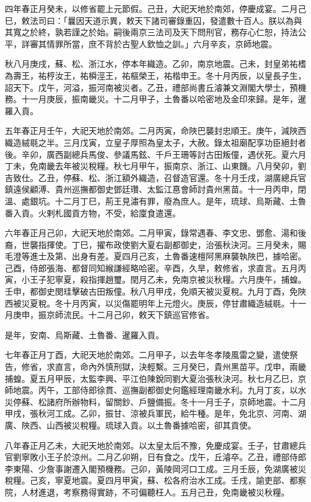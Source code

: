 \begin{pinyinscope}
四年春正月癸未，以修省罷上元節假。己丑，大祀天地於南郊，停慶成宴。二月己巳，敕法司曰：「曩因天道示異，敕天下諸司審錄重囚，發遣數十百人。朕以為與其寬之於終，孰若謹之於始。嗣後兩京三法司及天下問刑官，務存心仁恕，持法公平，詳審其情罪所當，庶不背於古聖人欽恤之訓。」六月辛亥，京師地震。

秋八月庚戌，蘇、松、浙江水，停本年織造。乙卯，南京地震。己未，封皇弟祐榰為壽王，祐梈汝王，祐橓涇王，祐樞榮王，祐楷申王。冬十月丙辰，以皇長子生，詔天下。戊午，河溢，振河南被災者。乙丑，禮部尚書丘濬兼文淵閣大學士，預機務。十一月庚辰，振南畿災。十二月甲子，土魯番以哈密地及金印來歸。是年，暹羅入貢。

五年春正月壬午，大祀天地於南郊。二月丙寅，命陜巴襲封忠順王。庚午，減陜西織造絨毼之半。三月戊寅，立皇子厚照為皇太子，大赦。錄太祖廟配享功臣絕封者後。辛卯，廣西副總兵馬俊、參議馬鉉、千戶王珊等討古田叛僮，遇伏死。夏六月丁未，免南畿去年被災稅糧。秋七月甲午，振南京、浙江、山東饑。八月癸卯，劉吉致仕。乙丑，停蘇、松、浙江額外織造，召督造官還。冬十月壬戌，湖廣總兵官鎮遠侯顧溥、貴州巡撫都御史鄧廷瓚、太監江惪會師討貴州黑苗。十一月丙申，閉溫、處銀坑。十二月丁巳，荊王見潚有罪，廢為庶人。是年，琉球、烏斯藏、土魯番入貢。火剌札國貢方物，不受，給廩食遣還。

六年春正月己卯，大祀天地於南郊。二月甲寅，錄常遇春、李文忠、鄧愈、湯和後裔，世襲指揮使。丁巳，擢布政使劉大夏右副都御史，治張秋決河。三月癸未，賜毛澄等進士及第、出身有差。夏四月己亥，土魯番速檀阿黑麻襲執陜巴，據哈密。己酉，侍郎張海、都督同知緱謙經略哈密。辛酉，久旱，敕修省，求直言。五月丙寅，小王子犯寧夏，殺指揮趙璽。閏月乙未，免南京被災秋糧。六月庚午，捕蝗。壬申，都御史閔珪擊破古田叛僮。秋八月甲戌，免順天被災夏稅。九月丁酉，免陜西被災夏稅。冬十月丙寅，以災傷罷明年上元燈火。庚辰，停甘肅織造絨毼。十一月庚申，振京師流民。十二月己卯，敕天下鎮巡官修省。

是年，安南、烏斯藏、土魯番、暹羅入貢。

七年春正月丁酉，大祀天地於南郊。二月甲子，以去年冬孝陵風雷之變，遣使祭告，修省，求直言，命內外慎刑獄，決輕繫。三月癸巳，貴州黑苗平。戊申，兩畿捕蝗。夏五月甲辰，太監李興、平江伯陳銳同劉大夏治張秋決河。秋七月乙巳，京師地震。丙午，工部侍郎徐貫、巡撫副都御史何鑑經理南畿水利。九月丁亥，以水災停蘇、松諸府所辦物料，留關鈔、戶鹽備振。冬十一月壬子，京師地震。十二月甲戌，張秋河工成。乙卯，振甘、涼被兵軍民，給牛種。是年，免北京、河南、湖廣、陜西、山西被災稅糧。琉球入貢。以土魯番據哈密，卻其貢使。

八年春正月乙未，大祀天地於南郊。以太皇太后不豫，免慶成宴。壬子，甘肅總兵官劉寧敗小王子於涼州。二月乙卯朔，日有食之。戊午，丘濬卒。乙丑，禮部侍郎李東陽、少詹事謝遷入閣預機務。己卯，黃陵岡河口工成。三月壬辰，免湖廣被災稅糧。己亥，寧夏地震。夏四月甲寅，蘇、松各府治水工成。壬戌，諭吏部、都察院，人材進退，考察務得實跡，不可偏聽枉人。五月己丑，免南畿被災秋糧。


\end{pinyinscope}
